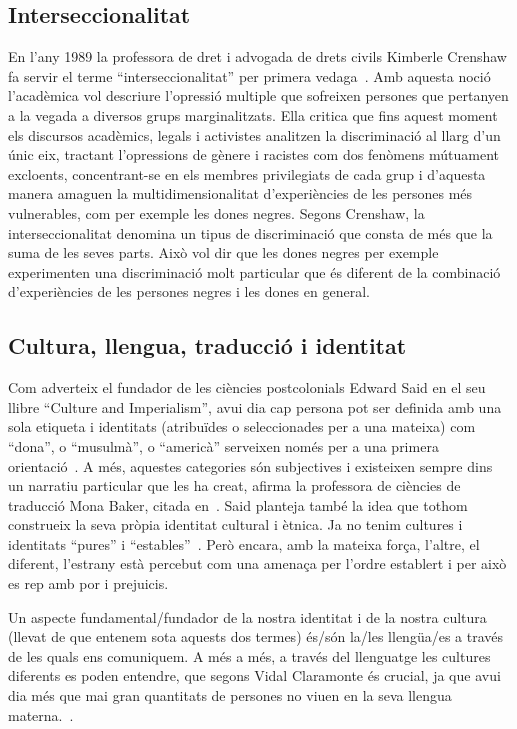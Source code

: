 \subsection{Interseccionalitat}
En l'any 1989 la professora de dret i advogada de drets civils Kimberle Crenshaw fa servir el terme ``interseccionalitat'' per primera vedaga~\autocite{Crenshaw1989}.
Amb aquesta noció l'acadèmica vol descriure l'opressió multiple que sofreixen persones que pertanyen a la vegada a diversos grups marginalitzats.
Ella critica que fins aquest moment els discursos acadèmics, legals i activistes analitzen la discriminació al llarg d'un únic eix,
tractant l'opressions de gènere i racistes com dos fenòmens mútuament excloents,
concentrant-se en els membres privilegiats de cada grup i d'aquesta manera amaguen la multidimensionalitat d'experiències de les persones més vulnerables, com per exemple les dones negres.
Segons Crenshaw, la interseccionalitat denomina un tipus de discriminació que consta de més que la suma de les seves parts.
Això vol dir que les dones negres per exemple experimenten una discriminació molt particular que és diferent de la combinació d'experiències de les persones negres i les dones en general.

\subsection{Cultura, llengua, traducció i identitat}
Com adverteix el fundador de les ciències postcolonials Edward Said en el seu llibre ``Culture and Imperialism'', avui dia cap persona pot ser definida amb una sola etiqueta
i identitats (atribuïdes o seleccionades per a una mateixa) com ``dona'', o ``musulmà'', o ``americà'' serveixen només per a una primera orientació~\autocite{Vidal2012}.
A més, aquestes categories són subjectives i existeixen sempre dins un narratiu particular que les ha creat, afirma la professora de ciències de traducció Mona Baker, citada en~\autocite{Vidal2012}.
Said planteja també la idea que tothom construeix la seva pròpia identitat cultural i ètnica.
Ja no tenim cultures i identitats ``pures'' i ``estables''~\autocite{Vidal2012}.
Però encara, amb la mateixa força, l'altre, el diferent, l'estrany està percebut com una amenaça per l'ordre establert i per això es rep amb por i prejuicis.

Un aspecte fundamental/fundador de la nostra identitat i de la nostra cultura (llevat de que entenem sota aquests dos termes) és/són la/les llengüa/es a través de les quals ens comuniquem.
A més a més, a través del llenguatge les cultures diferents es poden entendre, que segons Vidal Claramonte és crucial, ja que avui dia més que mai gran quantitats de persones no viuen en la seva llengua materna.~\autocite{Vidal2012}.

